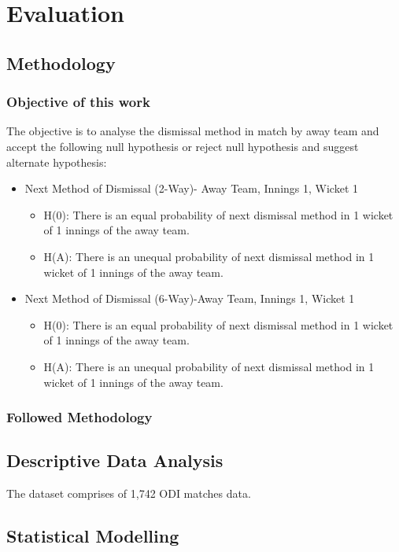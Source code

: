 \documentclass[fleqn,10pt]{wlscirep}
\begin{document}
\section{Evaluation}
\subsection{Methodology}
\subsubsection{Objective of this work}
The objective is to analyse the dismissal method in match by away team and accept the following null hypothesis or reject null hypothesis and suggest alternate hypothesis:
\begin{itemize}
    

\item Next Method of Dismissal (2-Way)- Away Team, Innings 1, Wicket 1
\begin{itemize}
\item H(0): There is an equal probability of next dismissal method in 1 wicket of 1 innings of the away team.
\item H(A): There is an unequal probability of next dismissal method in 1 wicket of 1 innings of the away team.
\end{itemize}
\item Next Method of Dismissal (6-Way)-Away Team, Innings 1, Wicket 1
\begin{itemize}
\item H(0): There is an equal probability of next dismissal method in 1 wicket of 1 innings of the away team.
\item H(A): There is an unequal probability of next dismissal method in 1 wicket of 1 innings of the away team.
\end{itemize}
\end{itemize}
\subsubsection{Followed Methodology}

\subsection{Descriptive Data Analysis}
The dataset comprises of 1,742 ODI matches data.
\subsection{Statistical Modelling}
\end{document}
